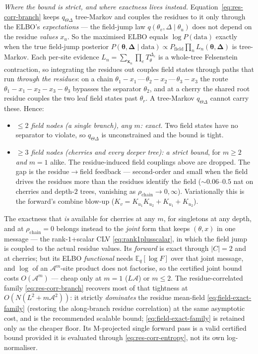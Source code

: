\emph{Where the bound is strict, and where exactness lives instead.}
Equation~\eqref{eq:res-corr-branch} keeps $q_{\Theta\Delta}$ tree-Markov and
couples the residues to it only through the ELBO's \emph{expectations} --- the
field-jump law $q(\theta_v,\Delta\mid\theta_u)$ does not depend on the residue
\emph{values} $x_u$. So the maximised ELBO equals $\log P(\mathrm{data})$
exactly when the true field-jump posterior
$P(\boldsymbol\theta,\boldsymbol\Delta\mid\mathrm{data})
 \propto P_{\mathrm{field}}\prod_n L_n(\boldsymbol\theta,\boldsymbol\Delta)$
is tree-Markov. Each per-site evidence
$L_n=\sum_{\mathbf{x}_n}\prod_e T^{\Delta_e}_\theta$ is a whole-tree Felsenstein
contraction, so integrating the residues out couples field states through paths
that run \emph{through the residues}: on a chain
$\theta_1\!-\!x_1\,\text{---}\,\theta_2\!-\!x_2\,\text{---}\,\theta_3\!-\!x_3$
the route $\theta_1\!-\!x_1\!-\!x_2\!-\!x_3\!-\!\theta_3$ bypasses the separator
$\theta_2$, and at a cherry the shared root residue couples the two leaf field
states past $\theta_r$. A tree-Markov $q_{\Theta\Delta}$ cannot carry these.
Hence:
\begin{itemize}\itemsep0pt
  \item \emph{$\le 2$ field nodes (a single branch), any $m$: exact.} Two field
        states have no separator to violate, so $q_{\Theta\Delta}$ is
        unconstrained and the bound is tight.
  \item \emph{$\ge 3$ field nodes (cherries and every deeper tree): a strict
        bound}, for $m\ge2$ \emph{and} $m=1$ alike. The residue-induced field
        couplings above are dropped. The gap is the residue$\to$field feedback
        --- second-order and small when the field drives the residues more than
        the residues identify the field ($\sim0.06$--$0.5$ nat on cherries and
        depth-$2$ trees, vanishing as $\rho_{\mathrm{chain}}\!\to\!0,\infty$).
        Variationally this is the forward's combine blow-up
        ($K_v=K_{u_1}K_{u_2}+K_{u_1}+K_{u_2}$).
\end{itemize}
The exactness that \emph{is} available for cherries at any $m$, for singletons
at any depth, and at $\rho_{\mathrm{chain}}=0$ belongs instead to the
\emph{joint} form that keeps $(\theta,x)$ in one message --- the rank-$1$+scalar
CLV \eqref{eq:rank1plusscalar}, in which the field jump is coupled to the actual
residue values. Its \emph{forward} is exact through $|C|=2$ and at cherries; but
its ELBO \emph{functional} needs $\mathbb E_q[\log F]$ over that joint message,
and $\log$ of an $\mathcal{A}^m$-site product does not factorise, so the
certified joint bound costs $O(\mathcal{A}^m)$ --- cheap only at $m=1$
($L\mathcal{A}$) or $m\le2$. The residue-correlated family
\eqref{eq:res-corr-branch} recovers most of that tightness at
$O(N(L^2+m\mathcal{A}^2))$: it strictly \emph{dominates} the residue mean-field
\eqref{eq:field-exact-family} (restoring the along-branch residue correlation)
at the same asymptotic cost, and is the recommended scalable bound;
\eqref{eq:field-exact-family} is retained only as the cheaper floor. Its
M-projected single forward pass is a valid certified bound provided it is
evaluated through \eqref{eq:res-corr-entropy}, not its own log-normaliser.

